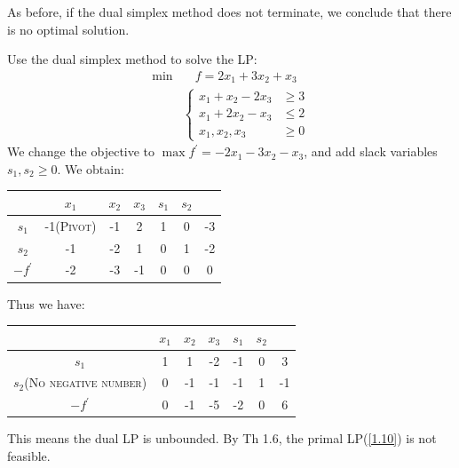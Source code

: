 As before, if the dual simplex method does not terminate, we conclude that there is no optimal solution.
\begin{example}
    Use the dual simplex method to solve the LP:
    \begin{align}
        \min &\quad f = 2x_1+3x_2+x_3 \nonumber\\
        & \left\lbrace\begin{array}{ll}
            x_1 + x_2-2x_3&\ge 3  \\
             x_1 + 2x_2 - x_3 &\le 2\\
             x_1, x_2, x_3&\ge 0
        \end{array}  \right.\label{1.10}
    \end{align}
    We change the objective to $\max f^{\prime} = -2x_1-3x_2-x_3$, and add slack variables $s_1, s_2\ge 0$. We obtain:
    \begin{table}[H]
        \centering
        \begin{tabular}{|c|ccccc|c|}
        \hline
        & $x_1$ & $x_2$ & $x_3$ & $s_1$ & $s_2$ & \\ \hline
        $s_1$ & -1(\textcolor{MarkerColour}{\textsc{Pivot}}) & -1 & 2 & 1 & 0 & -3 \\
        $s_2$ & -1 & -2 & 1 & 0 & 1 & -2\\ \hline
        $-f^{\prime}$ & -2 & -3 & -1 & 0 & 0 & 0\\ \hline
        \end{tabular}
        \label{tab-10-1}
    \end{table}
    Thus we have:
    \begin{table}[H]
        \centering
        \begin{tabular}{|c|ccccc|c|}
        \hline
        & $x_1$ & $x_2$ & $x_3$ & $s_1$ & $s_2$ & \\ \hline
        $s_1$ & 1 & 1 & -2 & -1 & 0 & 3 \\
        $s_2$(\textcolor{MarkerColour}{\textsc{No negative number}}) & 0 & -1 & -1 & -1 & 1 & -1\\ \hline
        $-f^{\prime}$ & 0 & -1 & -5 & -2 & 0 & 6\\ \hline
        \end{tabular}
        \label{tab-10-2}
    \end{table}
    This means the dual LP is unbounded. By Th 1.6, the primal LP(\ref{1.10}) is not feasible.
\end{example}

